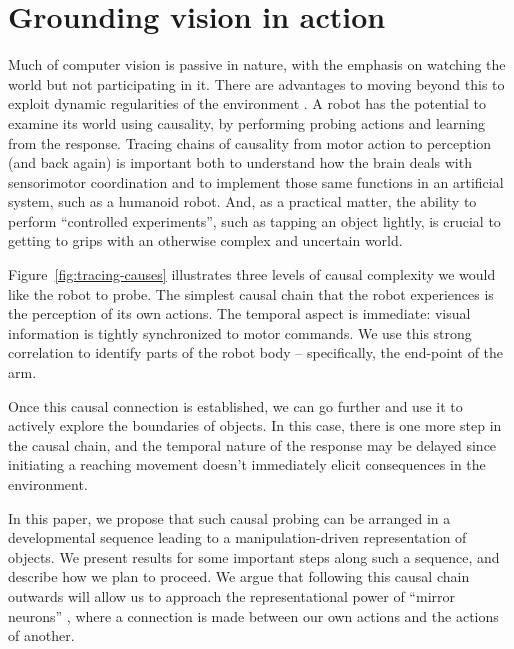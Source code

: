 \section{Grounding vision in action}

Much of computer vision is passive in nature, with the emphasis on
watching the world but not participating in it.  There are advantages
to moving beyond this to exploit dynamic regularities of the
environment \cite{ballard91animate}.
A robot has the
potential to examine its world using causality, by performing probing
actions and learning from the response.  Tracing chains of causality
from motor action to perception (and back again) is important both to
understand how the brain deals with sensorimotor coordination and to
implement those same functions in an artificial system, such as a
humanoid robot.  And, as a practical matter, the ability to perform
``controlled experiments'', such as tapping an object lightly, is
crucial to getting to grips with an otherwise complex and uncertain
world.

Figure~\ref{fig:tracing-causes} illustrates three levels of causal complexity
we would like the robot to probe.
The simplest causal chain that the robot experiences is the
perception of its own actions.  The temporal aspect is immediate:
visual information is tightly synchronized to motor commands.
We use this strong correlation to identify parts of the robot
body -- specifically, the end-point of the arm. 

Once this causal connection is established, we can go further and use
it to actively explore the boundaries of objects.  In this case, there
is one more step in the causal chain, and the temporal nature of
the response may be delayed since initiating a reaching movement doesn't
immediately elicit consequences in the environment.  


In this paper, we propose that such causal probing can be arranged in
a developmental sequence leading to a manipulation-driven
representation of objects.  We present results for some important
steps along such a sequence, and describe how we plan to proceed.  We
argue that following this causal chain outwards will allow us to
approach the representational power of ``mirror neurons''
\cite{gallese-fadiga-fogassi-rizzolatti-1996}, where a connection 
is made between our own actions and the actions of another.  


